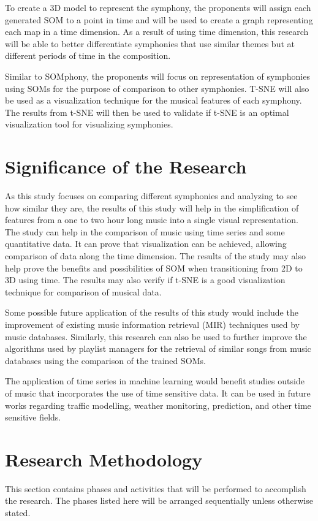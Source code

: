 To create a 3D model to represent the symphony, the proponents will assign each generated SOM to a point in time and will be used to create a graph representing each map in a time dimension. As a result of using time dimension, this research will be able to better differentiate symphonies that use similar themes but at different periods of time in the composition.

Similar to SOMphony, the proponents will  focus on representation of symphonies using SOMs for the purpose of comparison to other symphonies. T-SNE will also be used as a visualization technique for the musical features of each symphony. The results from t-SNE will then be used to validate if t-SNE is an optimal visualization tool for visualizing symphonies.

\section{Significance of the Research}
\label{sec:significance}
As this study focuses on comparing different symphonies and analyzing to see how similar they are, the results of this study will help in the simplification of features from a one to two hour long music into a single visual representation.  The study can help in the comparison of music using time series and some quantitative data. It can prove that visualization can be achieved, allowing comparison of data along the time dimension. The results of the study may also help prove the benefits and possibilities of SOM when transitioning from 2D to 3D using time. The results may also verify if t-SNE is a good visualization technique for comparison of musical data.

Some possible future application of the results of this study would include the improvement of existing music information retrieval (MIR) techniques used by music databases. Similarly, this research can also be used to further improve the algorithms used by playlist managers for the retrieval of similar songs from music databases using the comparison of the trained SOMs.

The application of time series in machine learning would benefit studies outside of music that incorporates the use of time sensitive data. It can be used in future works regarding traffic modelling, weather monitoring, prediction, and other time sensitive fields.

\section{Research Methodology}
\label{sec:researchmethod}
This section contains phases and activities that will be performed to accomplish the research. The phases listed here will be arranged sequentially unless otherwise stated.

